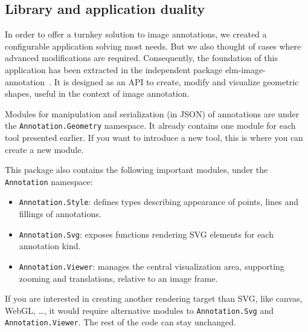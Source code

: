 

% 


\subsection{Library and application duality}

In order to offer a turnkey solution to image annotations,
we created a configurable application solving most needs.
But we also thought of cases where advanced modifications are required.
Consequently, the foundation of this application has been extracted
in the independent package elm-image-annotation~\cite{annotationpackage}.
It is designed as an API to create, modify and visualize geometric shapes,
useful in the context of image annotation.

Modules for manipulation and serialization (in JSON) of annotations are
under the \verb|Annotation.Geometry| namespace.
It already contains one module for each tool presented earlier.
If you want to introduce a new tool, this is where you can create a new module.

This package also contains the following important modules,
under the \verb|Annotation| namespace:
\begin{itemize}
	\item \verb|Annotation.Style|:
		defines types describing appearance of points, lines and fillings of annotations.
	\item \verb|Annotation.Svg|:
		exposes functions rendering SVG elements for each annotation kind.
	\item \verb|Annotation.Viewer|:
		manages the central visualization area,
		supporting zooming and translations, relative to an image frame.
\end{itemize}
If you are interested in creating another rendering target than SVG,
like canvas, WebGL, \ldots, it would require alternative modules
to \verb|Annotation.Svg| and \verb|Annotation.Viewer|.
The rest of the code can stay unchanged.


